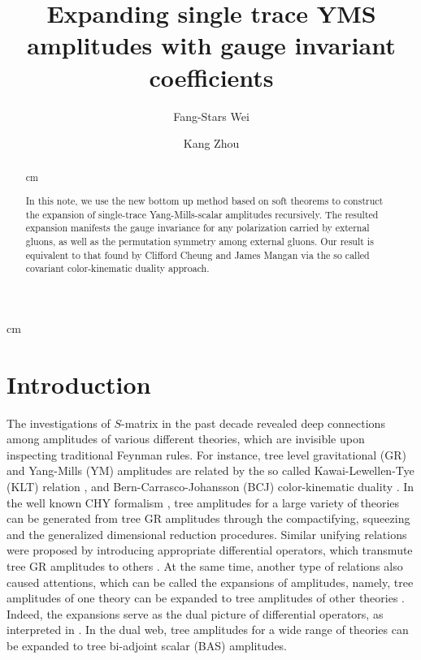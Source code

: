 \documentclass[preprint,showpacs,onecolumn,nofootinbib]{revtex4}
\begin{document}
 cm
\title{Expanding single trace YMS amplitudes with gauge invariant coefficients}
\author{Fang-Stars Wei}
\author{Kang Zhou}


\begin{abstract}
 cm

In this note, we use the new bottom up method based on soft theorems to construct the expansion of single-trace Yang-Mills-scalar amplitudes recursively. The resulted expansion manifests the gauge invariance for any polarization carried by external gluons, as well as the permutation symmetry among external gluons. Our result is equivalent to that found by Clifford Cheung and James Mangan via the so called covariant color-kinematic duality approach.

\end{abstract}

\maketitle




\section{Introduction}
\label{sec-intro}

The investigations of $S$-matrix in the past decade revealed deep connections among amplitudes of various different theories, which are invisible upon inspecting traditional Feynman rules.
For instance, tree level gravitational (GR) and Yang-Mills (YM) amplitudes are related by the so called Kawai-Lewellen-Tye (KLT) relation \cite{Kawai:1985xq}, and Bern-Carrasco-Johansson (BCJ) color-kinematic duality \cite{Bern:2008qj,Chiodaroli:2014xia,Johansson:2015oia,Johansson:2019dnu}. In the well known CHY formalism \cite{Cachazo:2013gna,Cachazo:2013hca, Cachazo:2013iea, Cachazo:2014nsa,Cachazo:2014xea}, tree amplitudes for a large variety of theories can be generated from tree GR amplitudes through the compactifying, squeezing and the generalized dimensional reduction procedures. Similar unifying relations were proposed by introducing appropriate differential operators, which transmute tree GR amplitudes to others \cite{Cheung:2017ems,Zhou:2018wvn,Bollmann:2018edb}. At the same time, another type of relations also caused attentions, which can be called the expansions of amplitudes, namely, tree amplitudes of one theory can be expanded to tree amplitudes of other theories \cite{Fu:2017uzt,Teng:2017tbo,Du:2017kpo,Du:2017gnh,Feng:2019tvb,Zhou:2019gtk,Zhou:2019mbe}. Indeed, the expansions serve as the dual picture of differential operators, as interpreted in \cite{Zhou:2019mbe}. In the dual web, tree amplitudes for a wide range of theories can be expanded to tree bi-adjoint scalar (BAS) amplitudes.
\end{document}
